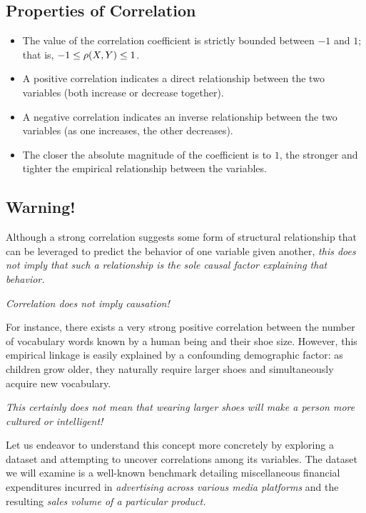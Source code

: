\subsection{Properties of Correlation}
\begin{itemize}
	\item The value of the correlation coefficient is strictly bounded between $-1$ and $1$; that is, $-1 \leq \rho(X,Y) \leq 1$.
	\item A positive correlation indicates a direct relationship between the two variables (both increase or decrease together).
	\item A negative correlation indicates an inverse relationship between the two variables (as one increases, the other decreases).
	\item The closer the absolute magnitude of the coefficient is to $1$, the stronger and tighter the empirical relationship between the variables.
\end{itemize}

\subsection{Warning!}
Although a strong correlation suggests some form of structural relationship that can be leveraged to predict the behavior of one variable given another, \emph{this does not imply that such a relationship is the sole causal factor explaining that behavior.}

\begin{observacion}
	\emph{Correlation does not imply causation!}
\end{observacion}

For instance, there exists a very strong positive correlation between the number of vocabulary words known by a human being and their shoe size. However, this empirical linkage is easily explained by a confounding demographic factor: as children grow older, they naturally require larger shoes and simultaneously acquire new vocabulary.

\emph{This certainly does not mean that wearing larger shoes will make a person more cultured or intelligent!}

Let us endeavor to understand this concept more concretely by exploring a dataset and attempting to uncover correlations among its variables. The dataset we will examine is a well-known benchmark detailing miscellaneous financial expenditures incurred in \emph{advertising across various media platforms} and the resulting \emph{sales volume of a particular product.}

